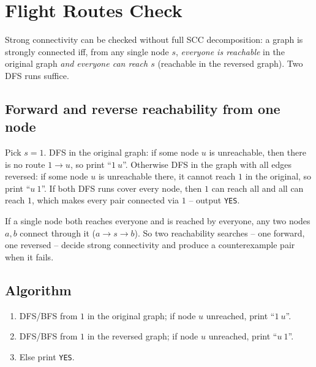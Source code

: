 \section{Flight Routes Check}
\label{sec:cses-flight-routes-check}


\begin{patternbox}
Strong connectivity can be checked without full SCC decomposition: a graph
is strongly connected iff, from any single node $s$, \emph{everyone is
reachable} in the original graph \emph{and} \emph{everyone can reach $s$}
(reachable in the reversed graph). Two DFS runs suffice.
\end{patternbox}

\subsection*{Forward and reverse reachability from one node}

Pick $s=1$. DFS in the original graph: if some node $u$ is unreachable, then
there is no route $1\to u$, so print ``$1\ u$''. Otherwise DFS in the graph
with all edges reversed: if some node $u$ is unreachable there, it cannot
reach $1$ in the original, so print ``$u\ 1$''. If both DFS runs cover every
node, then $1$ can reach all and all can reach $1$, which makes every pair
connected via $1$ -- output \texttt{YES}.

\begin{ideabox}[Strong Connectivity = Reach All and Be Reached from One Node]
If a single node both reaches everyone and is reached by everyone, any two
nodes $a,b$ connect through it ($a\to s\to b$). So two reachability
searches -- one forward, one reversed -- decide strong connectivity and
produce a counterexample pair when it fails.
\end{ideabox}

\subsection*{Algorithm}

\begin{enumerate}
  \item DFS/BFS from $1$ in the original graph; if node $u$ unreached,
        print ``$1\ u$''.
  \item DFS/BFS from $1$ in the reversed graph; if node $u$ unreached,
        print ``$u\ 1$''.
  \item Else print \texttt{YES}.
\end{enumerate}

